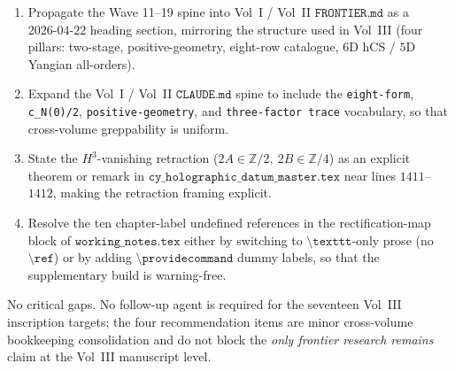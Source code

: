 \documentclass[11pt]{article}
\begin{document}
\begin{enumerate}
\item Propagate the Wave 11--19 spine into Vol~I / Vol~II
$\texttt{FRONTIER.md}$ as a $2026\text{-}04\text{-}22$ heading
section, mirroring the structure used in Vol~III
(four pillars: two-stage, positive-geometry, eight-row catalogue,
$6$D hCS / $5$D Yangian all-orders).
\item Expand the Vol~I / Vol~II $\texttt{CLAUDE.md}$ spine to
include the \texttt{eight-form}, \texttt{c\_N(0)/2},
\texttt{positive-geometry}, and \texttt{three-factor trace}
vocabulary, so that cross-volume greppability is uniform.
\item State the $H^3$-vanishing retraction
($2A \in \mathbb{Z}/2,\ 2B \in \mathbb{Z}/4$) as an explicit
theorem or remark in
$\texttt{cy\_holographic\_datum\_master.tex}$ near lines
$1411$--$1412$, making the retraction framing explicit.
\item Resolve the ten chapter-label undefined references in the
rectification-map block of $\texttt{working\_notes.tex}$ either
by switching to $\texttt{\textbackslash texttt}$-only prose
(no $\texttt{\textbackslash ref}$) or by adding
$\texttt{\textbackslash providecommand}$ dummy labels, so that
the supplementary build is warning-free.
\end{enumerate}

No critical gaps. No follow-up agent is required for the seventeen
Vol~III inscription targets; the four recommendation items are
minor cross-volume bookkeeping consolidation and do not block the
\emph{only frontier research remains} claim at the Vol~III
manuscript level.
\end{document}
